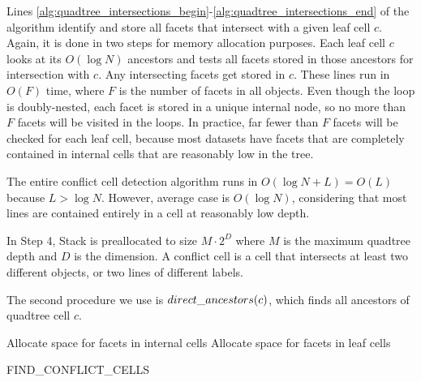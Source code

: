 \documentclass{egpubl}
\begin{document}
Lines \ref{alg:quadtree_intersections_begin}-\ref{alg:quadtree_intersections_end} of the algorithm identify and store all facets that intersect with a given leaf cell $c$. Again, it is done in two steps for memory allocation purposes. Each leaf cell $c$ looks at its $O(\log{N})$ ancestors and tests all facets stored in those ancestors for intersection with $c$. Any intersecting facets get stored in $c$. These lines run in $O(F)$ time, where $F$ is the number of facets in all objects. Even though the loop is doubly-nested, each facet is stored in a unique internal node, so no more than $F$ facets will be visited in the loops. In practice, far fewer than $F$ facets will be checked for each leaf cell, because most datasets have facets that are completely contained in internal cells that are reasonably low in the tree.

The entire conflict cell detection algorithm runs in $O(\log{N}+L) = O(L)$ because $L > \log{N}$. However, average case is $O(\log{N})$, considering that most lines are contained entirely in a cell at reasonably low depth.

In Step 4, Stack is preallocated to size $M\cdot2^D$ where $M$ is the maximum quadtree depth and $D$ is the dimension. A conflict cell is a cell that intersects at least two different objects, or two lines of different labels.


The second procedure we use is $direct\_ancestors(c)$, which finds all ancestors of quadtree cell $c$.



\algorithmspace
\begin{algorithm}
  \DontPrintSemicolon
  \LinesNumbered
  \BlankLine
  Allocate space for facets in internal cells\;
   \label{alg:quadtree_containing_end}
  Allocate space for facets in leaf cells\;
   \label{alg:quadtree_intersections_end}
\caption{FIND\_CONFLICT\_CELLS}
\label{alg:find-conflict-cells}
\end{algorithm}
\algorithmspace
\end{document}
